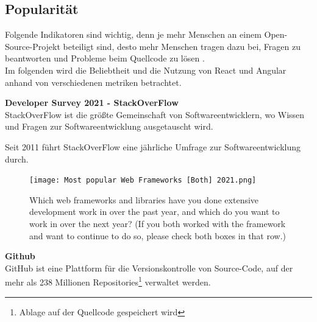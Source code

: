 \subsection{Popularität}
Folgende Indikatoren sind wichtig, denn je mehr Menschen an einem Open-Source-Projekt beteiligt sind, desto mehr Menschen tragen dazu bei, Fragen zu beantworten und Probleme beim Quellcode zu lösen {\cite{LIN1}}.
\\
Im folgenden wird die Beliebtheit und die Nutzung von React und Angular anhand von verschiedenen metriken betrachtet.

\begin{flushleft}
  \textbf{Developer Survey 2021 - StackOverFlow}\\
  StackOverFlow ist die größte Gemeinschaft von Softwareentwicklern, wo Wissen und Fragen zur Softwareentwicklung ausgetauscht wird.

  Seit 2011 führt StackOverFlow eine jährliche Umfrage zur Softwareentwicklung durch.

  \begin{figure}[h]
    \centering
    \texttt{[image: Most popular Web Frameworks [Both] 2021.png]}
    \caption{ Which web frameworks and libraries have you done extensive development work in over the past year, and which do you want to work in over the next year? (If you both worked with the framework and want to continue to do so, please check both boxes in that row.) {\cite{SO01}}}

  \end{figure}
\end{flushleft}

\newpage
\begin{flushleft}
  \textbf{Github}\\
  GitHub ist eine Plattform für die Versionskontrolle von Source-Code, auf der mehr als 238 Millionen Repositories\footnote{Ablage auf der Quellcode gespeichert wird} verwaltet werden{\cite{GH07}}.
\end{flushleft}

